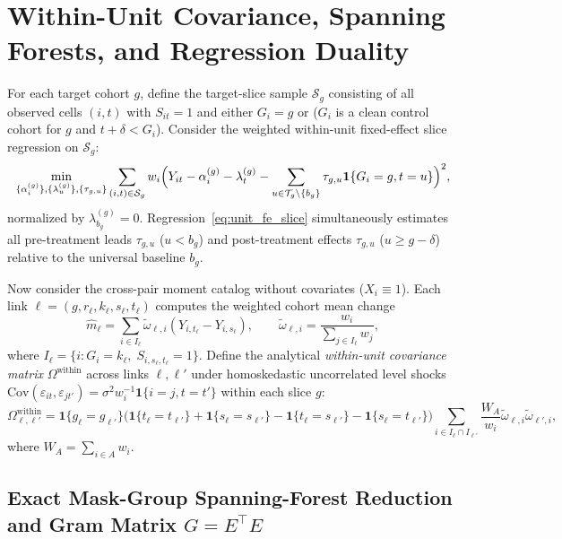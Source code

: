 \documentclass[11pt]{article}
\theoremstyle{definition}
\theoremstyle{remark}
\begin{document}
\section{Within-Unit Covariance, Spanning Forests, and Regression Duality}

For each target cohort $g$, define the target-slice sample $\mathcal{S}_g$ consisting of all observed cells $(i,t)$ with $S_{it}=1$ and either $G_i = g$ or ($G_i$ is a clean control cohort for $g$ and $t + \delta < G_i$). Consider the weighted within-unit fixed-effect slice regression on $\mathcal{S}_g$:
\begin{equation}\label{eq:unit_fe_slice}
\min_{\{\alpha_i^{(g)}\}, \{\lambda_u^{(g)}\}, \{\tau_{g,u}\}} \sum_{(i,t) \in \mathcal{S}_g} w_i \Bigl(Y_{it} - \alpha_i^{(g)} - \lambda_t^{(g)} - \sum_{u \in \mathcal{T}_g \setminus \{b_g\}} \tau_{g,u} \mathbf{1}\{G_i = g, t = u\}\Bigr)^2,
\end{equation}
normalized by $\lambda_{b_g}^{(g)} = 0$. Regression~\eqref{eq:unit_fe_slice} simultaneously estimates all pre-treatment leads $\tau_{g,u}$ ($u < b_g$) and post-treatment effects $\tau_{g,u}$ ($u \ge g - \delta$) relative to the universal baseline $b_g$.

Now consider the cross-pair moment catalog without covariates ($X_i \equiv 1$). Each link $\ell = (g, r_\ell, k_\ell, s_\ell, t_\ell)$ computes the weighted cohort mean change
\[
\hat{m}_\ell = \sum_{i \in I_\ell} \tilde{\omega}_{\ell, i} (Y_{i, t_\ell} - Y_{i, s_\ell}), \qquad \tilde{\omega}_{\ell, i} = \frac{w_i}{\sum_{j \in I_\ell} w_j},
\]
where $I_\ell = \{i : G_i = k_\ell,\; S_{i, s_\ell, t_\ell} = 1\}$. Define the analytical \emph{within-unit covariance matrix} $\Omega^{\mathrm{within}}$ across links $\ell, \ell'$ under homoskedastic uncorrelated level shocks $\mathrm{Cov}(\varepsilon_{it}, \varepsilon_{jt'}) = \sigma^2 w_i^{-1} \mathbf{1}\{i=j, t=t'\}$ within each slice $g$:
\begin{equation}\label{eq:v_within}
\Omega^{\mathrm{within}}_{\ell, \ell'} = \mathbf{1}\{g_\ell = g_{\ell'}\} \bigl(\mathbf{1}\{t_\ell = t_{\ell'}\} + \mathbf{1}\{s_\ell = s_{\ell'}\} - \mathbf{1}\{t_\ell = s_{\ell'}\} - \mathbf{1}\{s_\ell = t_{\ell'}\}\bigr) \sum_{i \in I_\ell \cap I_{\ell'}} \frac{W_A}{w_i} \tilde{\omega}_{\ell, i} \tilde{\omega}_{\ell', i},
\end{equation}
where $W_A = \sum_{i \in A} w_i$.

\subsection{Exact Mask-Group Spanning-Forest Reduction and Gram Matrix \texorpdfstring{$G = E^\top E$}{G = E'E}}
\end{document}
